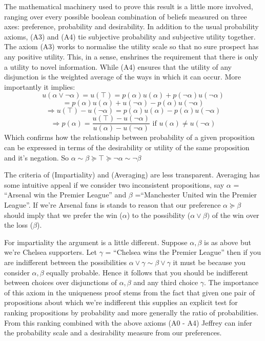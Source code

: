 \documentclass{tufte-handout}
\begin{document}
The mathematical machinery used to prove this result is a little more involved, ranging over every possible boolean combination of beliefs measured on three axes: preference, probability and desirability. In addition to the usual probability axioms, (A3) and (A4) tie subjective probability and subjective utility together. The axiom (A3) works to normalise the utility scale so that no sure prospect has any positive utility. This, in a sense, enshrines the requirement that there is only a utility to novel information. While (A4) ensures that the utility of any disjunction is the weighted average of the ways in which it can occur. More importantly it implies:
 $$u(\alpha \vee \neg\alpha) = u(\top) = p(\alpha)u(\alpha) + p(\neg\alpha)u(\neg\alpha)$$  
 $$= p(\alpha)u(\alpha) + u(\neg\alpha) - p(\alpha)u(\neg\alpha) $$
 $$ \Rightarrow u(\top) - u(\neg\alpha) = p(\alpha)u(\alpha)  - p(\alpha)u(\neg\alpha)$$
 $$ \Rightarrow p(\alpha) = \frac{u(\top) - u(\neg\alpha)}{ u(\alpha)  - u(\neg\alpha)} \text{  if } u(\alpha) \neq u(\neg\alpha) $$ 
Which confirms how the relationship between probability of a given proposition can be expressed in terms of the desirability or utility of the same proposition and it's negation. 
So $\alpha \sim \beta \succeq \top \succeq \neg\alpha \sim \neg\beta$
\newline

\noindent The criteria of (Impartiality) and (Averaging) are less transparent. Averaging has some intuitive appeal if we consider two inconsistent propositions, say $\alpha$ = ``Arsenal win the Premier League'' and  $\beta$ =``Manchester United win the Premier League''.  If we're Arsenal fans is stands to reason that our preference $\alpha \succeq \beta$ should imply that we prefer the win  ($\alpha$) to the possibility ($\alpha \vee \beta)$ of the win over the loss ($\beta$).  
 
\noindent For impartiality the argument is a little different. Suppose $\alpha, \beta $ is as above but we're Chelsea supporters. Let $\gamma$ = ``Chelsea wins the Premier League'' then if you are indifferent between the possibilities $\alpha \vee \gamma \sim \beta \vee \gamma$ it must be because you consider $\alpha , \beta$ equally probable. Hence it follows that you should be indifferent between choices over disjunctions of $\alpha, \beta$ and any third choice $\gamma$. The importance of this axiom in the uniqueness proof stems from the fact that given one pair of propositions about which we're indifferent this supplies an explicit test for ranking propositions by probability and more generally the ratio of probabilities. From this ranking combined with the above axioms (A0 - A4) Jeffrey can infer the probability scale and a desirability measure from our preferences. 



\end{document}
